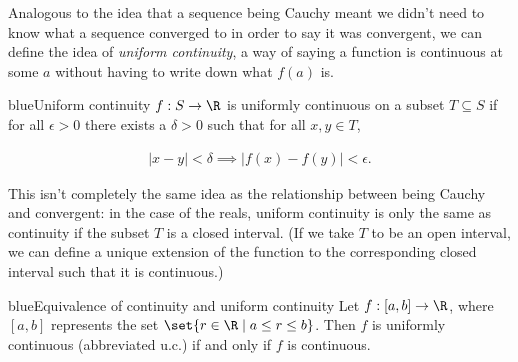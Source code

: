\documentclass[./analysis.tex]{subfiles}
\begin{document}
    Analogous to the idea that a sequence being Cauchy meant we didn't need to know what a sequence converged to in order to say it was convergent, we can define the idea of \emph{uniform continuity}, a way of saying a function is continuous at some $a$ without having to write down what $f(a)$ is. 

    \begin{mycolorbox}{blue}{Uniform continuity} 
        $f: S \to \R$ is uniformly continuous on a subset $T \subseteq S$ if for all $\epsilon > 0$ there exists a $\delta > 0$ such that for all $x, y \in T$,

        \begin{align*}
            |x - y| < \delta \implies |f(x) - f(y)| < \epsilon.
        \end{align*}
    \end{mycolorbox}

    This isn't completely the same idea as the relationship between being Cauchy and convergent: in the case of the reals, uniform continuity is only the same as continuity if the subset $T$ is a closed interval. (If we take $T$ to be an open interval, we can define a unique extension of the function to the corresponding closed interval such that it is continuous.)

    \begin{mycolorbox}{blue}{Equivalence of continuity and uniform continuity}
        Let $f: [a, b] \to \R$, where $[a, b]$ represents the set $\set{r \in \R \mid a \leq r \leq b}$. Then $f$ is uniformly continuous (abbreviated u.c.) if and only if $f$ is continuous.
    \end{mycolorbox}
\end{document}
